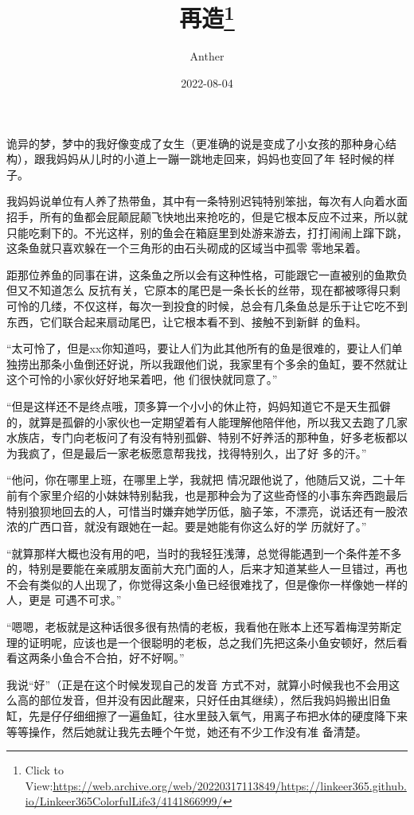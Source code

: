 \documentclass{article}
\title{再造\footnote{Click to View:\url{https://web.archive.org/web/20220317113849/https://linkeer365.github.io/Linkeer365ColorfulLife3/4141866999/}}}
\author{Anther}
\date{2022-08-04}
\begin{document}

\maketitle


\Large

﻿诡异的梦，梦中的我好像变成了女生（更准确的说是变成了小女孩的那种身心结构），跟我妈妈从儿时的小道上一蹦一跳地走回来，妈妈也变回了年
轻时候的样子。 

我妈妈说单位有人养了热带鱼，其中有一条特别迟钝特别笨拙，每次有人向着水面招手，所有的鱼都会屁颠屁颠飞快地出来抢吃的，但是它根本反应不过来，所以就只能吃剩下的。不光这样，别的鱼会在箱庭里到处游来游去，打打闹闹上蹿下跳，这条鱼就只喜欢躲在一个三角形的由石头砌成的区域当中孤零
零地呆着。 

距那位养鱼的同事在讲，这条鱼之所以会有这种性格，可能跟它一直被别的鱼欺负但又不知道怎么
\newpage
反抗有关，它原本的尾巴是一条长长的丝带，现在都被啄得只剩可怜的几缕，不仅这样，每次一到投食的时候，总会有几条鱼总是乐于让它吃不到东西，它们联合起来扇动尾巴，让它根本看不到、接触不到新鲜
的鱼料。 

“太可怜了，但是xx你知道吗，要让人们为此其他所有的鱼是很难的，要让人们单独捞出那条小鱼倒还好说，所以我跟他们说，我家里有个多余的鱼缸，要不然就让这个可怜的小家伙好好地呆着吧，他
们很快就同意了。” 

“但是这样还不是终点哦，顶多算一个小小的休止符，妈妈知道它不是天生孤僻的，就算是孤僻的小家伙也一定期望着有人能理解他陪伴他，所以我又去跑了几家水族店，专门向老板问了有没有特别孤僻、特别不好养活的那种鱼，好多老板都以为我疯了，但是最后一家老板愿意帮我找，找得特别久，出了好
多的汗。” 

“他问，你在哪里上班，在哪里上学，我就把
\newpage
情况跟他说了，他随后又说，二十年前有个家里介绍的小妹妹特别黏我，也是那种会为了这些奇怪的小事东奔西跑最后特别狼狈地回去的人，可惜当时嫌弃她学历低，脑子笨，不漂亮，说话还有一股浓浓的广西口音，就没有跟她在一起。要是她能有你这么好的学
历就好了。” 

“就算那样大概也没有用的吧，当时的我轻狂浅薄，总觉得能遇到一个条件差不多的，特别是要能在亲戚朋友面前大充门面的人，后来才知道某些人一旦错过，再也不会有类似的人出现了，你觉得这条小鱼已经很难找了，但是像你一样像她一样的人，更是
可遇不可求。” 

“嗯嗯，老板就是这种话很多很有热情的老板，我看他在账本上还写着梅涅劳斯定理的证明呢，应该也是一个很聪明的老板，总之我们先把这条小鱼安顿好，然后看看这两条小鱼合不合拍，好不好啊。”
 

我说“好”（正是在这个时候发现自己的发音
\newpage
方式不对，就算小时候我也不会用这么高的部位发音，但并没有因此醒来，只好任由其继续），然后我妈妈搬出旧鱼缸，先是仔仔细细擦了一遍鱼缸，往水里鼓入氧气，用离子布把水体的硬度降下来等等操作，然后她就让我先去睡个午觉，她还有不少工作没有准
备清楚。 
\end{document}
